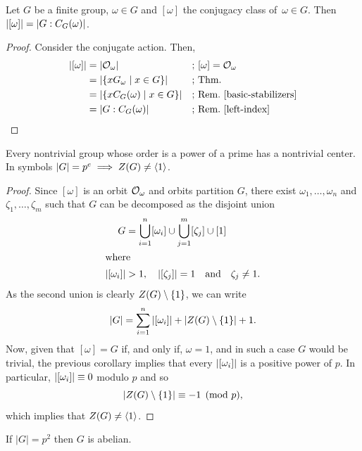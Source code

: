 \begin{cor}
    Let $G$ be a finite group, $\omega \in G$ and\/ $[\omega]$ the conjugacy class of\/~$\omega\in G$. Then $\left\vert{[\omega]}\right\vert = \left\vert{G:C_G(\omega)}\right\vert$.
\end{cor}

\begin{proof} Consider the conjugate action. Then,
\begin{align*}
    \left\vert{[\omega]}\right\vert &= \left\vert{{\cal O}_\omega}\right\vert&&\textrm{; $[\omega]={\cal O}_\omega$}\\
        &= \left\vert{\{xG_\omega\mid x\in G\}}\right\vert&&\textrm{; Thm.}\\
        &= \left\vert{\{xC_G(\omega)\mid x\in G\}}\right\vert&&\textrm{; Rem.~\ref{basic-stabilizers}}\\
        &= \left\vert{G:C_G(\omega)}\right\vert&&\textrm{; Rem.~\ref{left-index}}
\end{align*}
 \end{proof}

\begin{cor}\label{p-groups-have-center}
    Every nontrivial group whose order is a power of a prime has a nontrivial center. In symbols $\left\vert{G}\right\vert=p^e\implies Z(G)\ne\langle1\rangle$.
    
    \textrm{}
\end{cor}

\begin{proof} Since $[\omega]$ is an orbit ${\cal O}_\omega$ and orbits partition $G$, there exist $\omega_1,\dots,\omega_n$ and $\zeta_1,\dots,\zeta_m$ such that $G$ can be decomposed as the disjoint union
\begin{align*}
    G &= \bigcup_{i=1}^n[\omega_i] \cup \bigcup_{j=1}^m[\zeta_j] \cup[1]\\
    \intertext{where}
    \left\vert{[\omega_i]}\right\vert&>1,\quad\left\vert{[\zeta_j]}\right\vert=1\quad\text{and}\quad \zeta_j\ne1.
\end{align*}
 As the second union is clearly $Z(G)\setminus\{1\}$, we can write
 $$
    \left\vert{G}\right\vert = \sum_{i=1}^n|[\omega_i]| + |Z(G)\setminus\{1\}| + 1.
 $$
 Now, given that $[\omega]=G$ if, and only if, $\omega=1$, and in such a case $G$ would be trivial, the previous corollary implies that every $\left\vert{[\omega_i]}\right\vert$ is a positive power of $p$. In particular, $\left\vert{[\omega_i]}\right\vert\equiv0$ modulo $p$ and so
 $$
    |Z(G)\setminus\{1\}|\equiv-1\pmod p,
 $$
which implies that $Z(G)\ne\langle1\rangle$.  \end{proof}

\begin{cor}\label{p-squared-is-abelian}
    If\/ $|G|=p^2$ then $G$ is abelian. \textrm{}
\end{cor}

